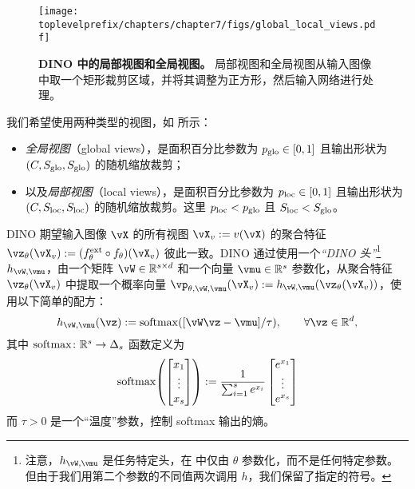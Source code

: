 \documentclass[../../book-main.tex]{subfiles}
\begin{document}
\begin{figure}
    \centering 
    \texttt{[image: \\toplevelprefix/chapters/chapter7/figs/global\_local\_views.pdf]}
    \caption{\textbf{DINO 中的局部视图和全局视图。} 局部视图和全局视图从输入图像中取一个矩形裁剪区域，并将其调整为正方形，然后输入网络进行处理。}
    \label{fig:dino_local_global_views}
\end{figure}

我们希望使用两种类型的视图，如  所示：
\begin{itemize}
    \item \textit{全局视图}（global views），是面积百分比参数为 \(p_{\mathrm{glo}} \in [0, 1]\) 且输出形状为 \((C, S_{\mathrm{glo}}, S_{\mathrm{glo}})\) 的随机缩放裁剪；
    \item 以及\textit{局部视图}（local views），是面积百分比参数为 \(p_{\mathrm{loc}} \in [0, 1]\) 且输出形状为 \((C, S_{\mathrm{loc}}, S_{\mathrm{loc}})\) 的随机缩放裁剪。这里 \(p_{\mathrm{loc}} < p_{\mathrm{glo}}\) 且 \(S_{\mathrm{loc}} < S_{\mathrm{glo}}\)。
\end{itemize}

DINO 期望输入图像 \(\vX\) 的所有视图 \(\vX_{v} := v(\vX)\) 的聚合特征 \(\vz_{\theta}(\vX_{v}) := (f_{\theta}^{\ext} \circ f_{\theta})(\vX_{v})\) 彼此一致。DINO 通过使用一个\textit{“DINO 头”}\footnote{注意，\(h_{\vW, \vmu}\) 是任务特定头，在  中仅由 \(\theta\) 参数化，而不是任何特定参数。但由于我们用第二个参数的不同值两次调用 \(h\)，我们保留了指定的符号。} \(h_{\vW, \vmu}\)，由一个矩阵 \(\vW \in \R^{s \times d}\) 和一个向量 \(\vmu \in \R^{s}\) 参数化，从聚合特征 \(\vz_{\theta}(\vX_{v})\) 中提取一个概率向量 \(\vp_{\theta, \vW, \vmu}(\vX_{v}) := h_{\vW, \vmu}(\vz_{\theta}(\vX_{v}))\)，使用以下简单的配方：
\begin{equation}
    h_{\vW, \vmu}(\vz) := \softmax([\vW\vz - \vmu]/\tau), \qquad \forall \vz \in \R^{d},
\end{equation}
其中 \(\operatorname{\mathrm{softmax}} \colon \mathbb{R}^{s} \to \Delta_{s}\) 函数定义为
\begin{equation}
    \softmax\rp{\mat{x_{1} \\ \vdots \\ x_{s}}} := \frac{1}{\sum_{i = 1}^{s}e^{x_{i}}}\mat{e^{x_{1}} \\ \vdots \\ e^{x_{s}}}
\end{equation}
而 \(\tau > 0\) 是一个“温度”参数，控制 softmax 输出的熵。
\end{document}
